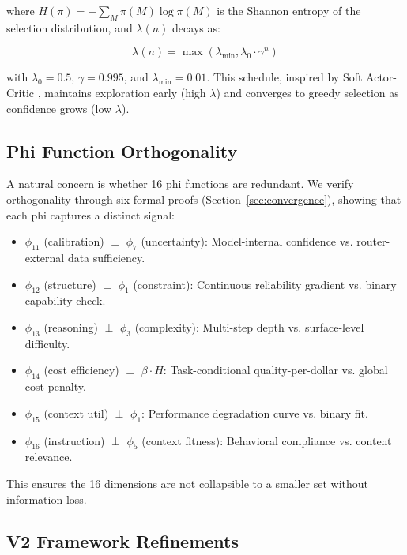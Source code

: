 where $H(\pi) = -\sum_M \pi(M) \log \pi(M)$ is the Shannon entropy of the selection distribution, and $\lambda(n)$ decays as:

\begin{equation}
\lambda(n) = \max\left(\lambda_{\min}, \lambda_0 \cdot \gamma^n\right)
\end{equation}

with $\lambda_0 = 0.5$, $\gamma = 0.995$, and $\lambda_{\min} = 0.01$. This schedule, inspired by Soft Actor-Critic \citep{haarnoja2018sac}, maintains exploration early (high $\lambda$) and converges to greedy selection as confidence grows (low $\lambda$).

\subsection{Phi Function Orthogonality}

A natural concern is whether 16 phi functions are redundant. We verify orthogonality through six formal proofs (Section~\ref{sec:convergence}), showing that each phi captures a distinct signal:

\begin{itemize}
    \item $\phi_{11}$ (calibration) $\perp$ $\phi_7$ (uncertainty): Model-internal confidence vs. router-external data sufficiency.
    \item $\phi_{12}$ (structure) $\perp$ $\phi_1$ (constraint): Continuous reliability gradient vs. binary capability check.
    \item $\phi_{13}$ (reasoning) $\perp$ $\phi_3$ (complexity): Multi-step depth vs. surface-level difficulty.
    \item $\phi_{14}$ (cost efficiency) $\perp$ $\beta \cdot H$: Task-conditional quality-per-dollar vs. global cost penalty.
    \item $\phi_{15}$ (context util) $\perp$ $\phi_1$: Performance degradation curve vs. binary fit.
    \item $\phi_{16}$ (instruction) $\perp$ $\phi_5$ (context fitness): Behavioral compliance vs. content relevance.
\end{itemize}

This ensures the 16 dimensions are not collapsible to a smaller set without information loss.

\subsection{V2 Framework Refinements}
\label{sec:v2_refinements}

